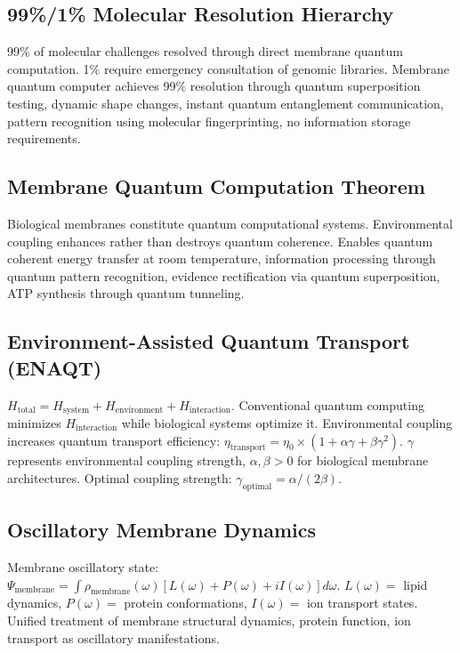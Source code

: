 \documentclass[12pt,a4paper]{article}
\begin{document}
\subsection{99\%/1\% Molecular Resolution Hierarchy}

99\% of molecular challenges resolved through direct membrane quantum computation. 1\% require emergency consultation of genomic libraries. Membrane quantum computer achieves 99\% resolution through quantum superposition testing, dynamic shape changes, instant quantum entanglement communication, pattern recognition using molecular fingerprinting, no information storage requirements.

\subsection{Membrane Quantum Computation Theorem}

Biological membranes constitute quantum computational systems. Environmental coupling enhances rather than destroys quantum coherence. Enables quantum coherent energy transfer at room temperature, information processing through quantum pattern recognition, evidence rectification via quantum superposition, ATP synthesis through quantum tunneling.

\subsection{Environment-Assisted Quantum Transport (ENAQT)}

$H_{\text{total}} = H_{\text{system}} + H_{\text{environment}} + H_{\text{interaction}}$. Conventional quantum computing minimizes $H_{\text{interaction}}$ while biological systems optimize it. Environmental coupling increases quantum transport efficiency: $\eta_{\text{transport}} = \eta_0 \times (1 + \alpha\gamma + \beta\gamma^2)$. $\gamma$ represents environmental coupling strength, $\alpha, \beta > 0$ for biological membrane architectures. Optimal coupling strength: $\gamma_{\text{optimal}} = \alpha/(2\beta)$.

\subsection{Oscillatory Membrane Dynamics}

Membrane oscillatory state: $\Psi_{\text{membrane}} = \int \rho_{\text{membrane}}(\omega) [L(\omega) + P(\omega) + iI(\omega)] d\omega$. $L(\omega) =$ lipid dynamics, $P(\omega) =$ protein conformations, $I(\omega) =$ ion transport states. Unified treatment of membrane structural dynamics, protein function, ion transport as oscillatory manifestations.
\end{document}
